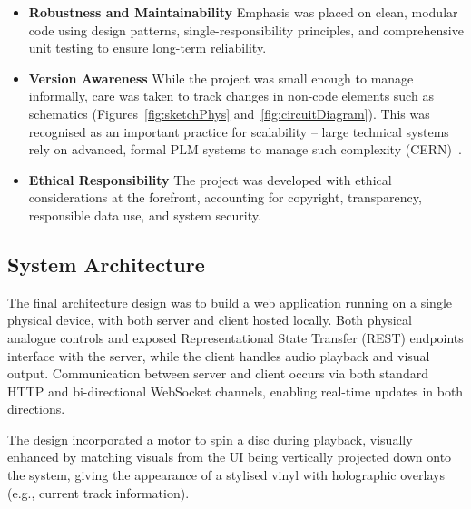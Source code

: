             \begin{itemize}
                \item \textbf{Robustness and Maintainability} Emphasis was placed on clean, modular code using design patterns, single-responsibility principles, and comprehensive unit testing to ensure long-term reliability.
            \end{itemize}
    
            \begin{itemize}
                \item \textbf{Version Awareness} While the project was small enough to manage informally, care was taken to track changes in non-code elements such as schematics (Figures~\ref{fig:sketchPhys} and~\ref{fig:circuitDiagram}). This was recognised as an important practice for scalability -- large technical systems rely on advanced, formal PLM systems to manage such complexity (CERN)~\cite{friman2023plm}.
            \end{itemize}
    
            \begin{itemize}
                \item \textbf{Ethical Responsibility} The project was developed with ethical considerations at the forefront, accounting for copyright, transparency, responsible data use, and system security.
            \end{itemize}
        
        \subsection{System Architecture} %
    
            The final architecture design was to build a web application running on a single physical device, with both server and client hosted locally. Both physical analogue controls and exposed Representational State Transfer (REST) endpoints interface with the server, while the client handles audio playback and visual output. Communication between server and client occurs via both standard HTTP and bi-directional WebSocket channels, enabling real-time updates in both directions.
    
            The design incorporated a motor to spin a disc during playback, visually enhanced by matching visuals from the UI being vertically projected down onto the system, giving the appearance of a stylised vinyl with holographic overlays (e.g., current track information).
    
